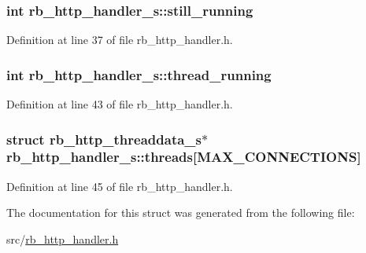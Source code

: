 \subsubsection[{still\+\_\+running}]{\setlength{\rightskip}{0pt plus 5cm}int rb\+\_\+http\+\_\+handler\+\_\+s\+::still\+\_\+running}\label{structrb__http__handler__s_aa49e97bedda03106912088dad0b75e64}


Definition at line 37 of file rb\+\_\+http\+\_\+handler.\+h.

\hypertarget{structrb__http__handler__s_a978656c7c89a80d411121107c97a0dcd}{}
\subsubsection[{thread\+\_\+running}]{\setlength{\rightskip}{0pt plus 5cm}int rb\+\_\+http\+\_\+handler\+\_\+s\+::thread\+\_\+running}\label{structrb__http__handler__s_a978656c7c89a80d411121107c97a0dcd}


Definition at line 43 of file rb\+\_\+http\+\_\+handler.\+h.

\hypertarget{structrb__http__handler__s_a6ccfd1d592021f903fc8fd4331ee1a46}{}
\subsubsection[{threads}]{\setlength{\rightskip}{0pt plus 5cm}struct {\bf rb\+\_\+http\+\_\+threaddata\+\_\+s}$\ast$ rb\+\_\+http\+\_\+handler\+\_\+s\+::threads\mbox{[}{\bf M\+A\+X\+\_\+\+C\+O\+N\+N\+E\+C\+T\+I\+O\+N\+S}\mbox{]}}\label{structrb__http__handler__s_a6ccfd1d592021f903fc8fd4331ee1a46}


Definition at line 45 of file rb\+\_\+http\+\_\+handler.\+h.



The documentation for this struct was generated from the following file\+:\begin{DoxyCompactItemize}
\item 
src/\hyperlink{rb__http__handler_8h}{rb\+\_\+http\+\_\+handler.\+h}\end{DoxyCompactItemize}

